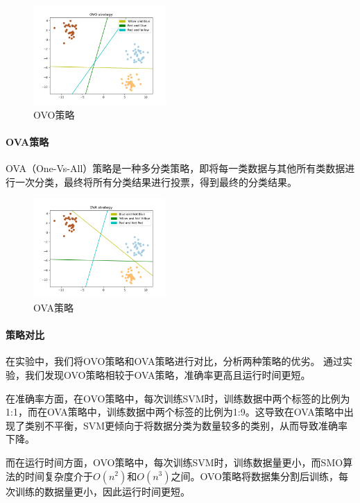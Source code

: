 \documentclass[a4paper]{article}
\begin{document}
\begin{figure}[H]
    \centering
    \includegraphics[width=0.45\textwidth]{pictures/OVO.png}
    \caption{OVO策略}
\end{figure}

\paragraph*{OVA策略}
OVA（One-Vs-All）策略是一种多分类策略，即将每一类数据与其他所有类数据进行一次分类，最终将所有分类结果进行投票，得到最终的分类结果。

\begin{figure}[H]
    \centering
    \includegraphics[width=0.45\textwidth]{pictures/OVA.png}
    \caption{OVA策略}
\end{figure}

\paragraph*{策略对比}
在实验中，我们将OVO策略和OVA策略进行对比，分析两种策略的优劣。
通过实验，我们发现OVO策略相较于OVA策略，准确率更高且运行时间更短。

在准确率方面，在OVO策略中，每次训练SVM时，训练数据中两个标签的比例为1:1，而在OVA策略中，训练数据中两个标签的比例为1:9。这导致在OVA策略中出现了类别不平衡，SVM更倾向于将数据分类为数量较多的类别，从而导致准确率下降。

而在运行时间方面，OVO策略中，每次训练SVM时，训练数据量更小，而SMO算法的时间复杂度介于$O(n^2)$和$O(n^3)$之间。OVO策略将数据集分割后训练，每次训练的数据量更小，因此运行时间更短。
\end{document}

